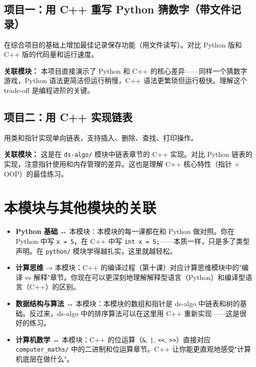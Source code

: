 \documentclass[a4paper,12pt]{ctexart}
\begin{document}
\subsection*{项目一：用 C++ 重写 Python 猜数字（带文件记录）}

在综合项目的基础上增加最佳记录保存功能（用文件读写）。对比 Python 版和 C++ 版的代码量和运行速度。

\textbf{关联模块：} 本项目直接演示了 Python 和 C++ 的核心差异——同样一个猜数字游戏，Python 语法更简洁但运行稍慢，C++ 语法更繁琐但运行极快。理解这个 trade-off 是编程进阶的关键。

\subsection*{项目二：用 C++ 实现链表}

用类和指针实现单向链表，支持插入、删除、查找、打印操作。

\textbf{关联模块：} 这是在 \texttt{ds-algo/} 模块中链表章节的 C++ 实现。对比 Python 链表的实现，注意指针使用和内存管理的差异。这也是理解 C++ 核心特性（指针 + OOP）的最佳练习。

\section*{本模块与其他模块的关联}

\begin{itemize}
  \item \textbf{Python 基础} ↔ 本模块：本模块的每一课都在和 Python 做对照。你在 Python 中写 \texttt{x = 5}，在 C++ 中写 \texttt{int x = 5;}——本质一样，只是多了类型声明。在 \texttt{python/} 模块学得越扎实，这里就越轻松。
  \item \textbf{计算思维} → 本模块：C++ 的编译过程（第十课）对应计算思维模块中的"编译 vs 解释"章节。你现在可以更深刻地理解解释型语言（Python）和编译型语言（C++）的区别。
  \item \textbf{数据结构与算法} ↔ 本模块：本模块的数组和指针是 ds-algo 中链表和树的基础。反过来，ds-algo 中的排序算法可以在这里用 C++ 重新实现——这是很好的练习。
  \item \textbf{计算机数学} ↔ 本模块：C++ 的位运算（\texttt{\&}, \texttt{|}, \texttt{<<}, \texttt{>>}）直接对应 \texttt{computer\_maths/} 中的二进制和位运算章节。C++ 让你能更直观地感受"计算机底层在做什么"。
\end{itemize}
\end{document}
